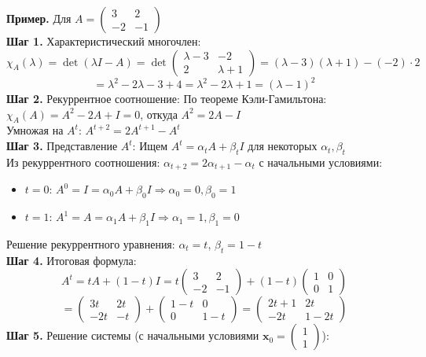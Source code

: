 \textbf{Пример.} Для $A = \begin{pmatrix} 3 & 2 \\ -2 & -1 \end{pmatrix}$\\
\textbf{Шаг 1.} Характеристический многочлен:
$$\chi_A(\lambda) = \det(\lambda I - A) = \det\begin{pmatrix} \lambda-3 & -2 \\ 2 & \lambda+1 \end{pmatrix} = (\lambda-3)(\lambda+1) - (-2) \cdot 2$$
$$= \lambda^2 - 2\lambda - 3 + 4 = \lambda^2 - 2\lambda + 1 = (\lambda-1)^2$$
\textbf{Шаг 2.} Рекуррентное соотношение:
По теореме Кэли-Гамильтона: $\chi_A(A) = A^2 - 2A + I = 0$, откуда $A^2 = 2A - I$\\
Умножая на $A^t$: $A^{t+2} = 2A^{t+1} - A^t$\\
\textbf{Шаг 3.} Представление $A^t$:
Ищем $A^t = \alpha_t A + \beta_t I$ для некоторых $\alpha_t, \beta_t$\\
Из рекуррентного соотношения: $\alpha_{t+2} = 2\alpha_{t+1} - \alpha_t$ с начальными условиями:
\begin{itemize}
\item $t=0$: $A^0 = I = \alpha_0 A + \beta_0 I \Rightarrow \alpha_0 = 0, \beta_0 = 1$
\item $t=1$: $A^1 = A = \alpha_1 A + \beta_1 I \Rightarrow \alpha_1 = 1, \beta_1 = 0$
\end{itemize}
Решение рекуррентного уравнения: $\alpha_t = t$, $\beta_t = 1-t$\\
\textbf{Шаг 4.} Итоговая формула:
$$A^t = tA + (1-t)I = t\begin{pmatrix} 3 & 2 \\ -2 & -1 \end{pmatrix} + (1-t)\begin{pmatrix} 1 & 0 \\ 0 & 1 \end{pmatrix}$$
$$= \begin{pmatrix} 3t & 2t \\ -2t & -t \end{pmatrix} + \begin{pmatrix} 1-t & 0 \\ 0 & 1-t \end{pmatrix} = \begin{pmatrix} 2t+1 & 2t \\ -2t & 1-2t \end{pmatrix}$$
\textbf{Шаг 5.} Решение системы (с начальными условиями $\mathbf{x}_0 = \begin{pmatrix} 1 \\ 1 \end{pmatrix}$):

